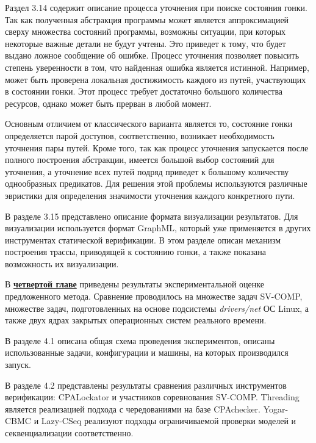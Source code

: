 Раздел 3.14 содержит описание процесса уточнения при поиске состояния гонки.
Так как полученная абстракция программы может является аппроксимацией сверху множества состояний программы, возможны ситуации, при которых некоторые важные детали не будут учтены. 
Это приведет к тому, что будет выдано ложное сообщение об ошибке. 
Процесс уточнения позволяет повысить степень уверенности в том, что найденная ошибка является истинной.
Например, может быть проверена локальная достижимость каждого из путей, участвующих в состоянии гонки.
Этот процесс требует достаточно большого количества ресурсов, однако может быть прерван в любой момент.

Основным отличием от классического варианта является то, состояние гонки определяется парой доступов, соответственно, возникает необходимость уточнения пары путей.
Кроме того, так как процесс уточнения запускается после полного построения абстракции, имеется большой выбор состояний для уточнения, а уточнение всех путей подряд приведет к большому количеству однообразных предикатов.
Для решения этой проблемы используются различные эвристики для определения значимости уточнения каждого конкретного пути.

В разделе 3.15 представлено описание формата визуализации результатов.
Для визуализации используется формат GraphML, который уже применяется в других инструментах статической верификации.
В этом разделе описан механизм построения трассы, приводящей к состоянию гонки, а также показана возможность их визуализации.


В \underline{\textbf{четвертой главе}} приведены результаты экспериментальной оценке предложенного метода.
Сравнение проводилось на множестве задач SV-COMP, множестве задач, подготовленных на основе подсистемы \textit{drivers/net} ОС Linux, а также двух ядрах закрытых операционных систем реального времени.

В разделе 4.1 описана общая схема проведения экспериментов, описаны использованные задачи, конфигурации и машины, на которых производился запуск.

В разделе 4.2 представлены результаты сравнения различных инструментов верификации: CPALockator и участников соревнования SV-COMP.
Threading является реализацией подхода с чередованиями на базе CPAchecker.
Yogar-CBMC и Lazy-CSeq реализуют подходы ограничиваемой проверки моделей и секвенциализации соответственно.

